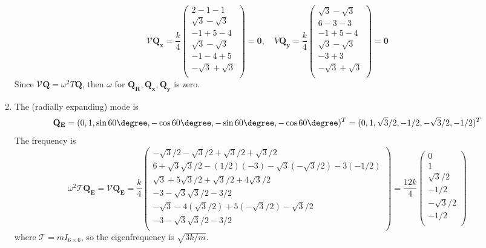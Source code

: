 \documentclass[a4paper]{article}
\begin{document}
\begin{ans}
\begin{enumerate}[label=(\roman*)]
 $$\mathcal{V}\mathbf{Q_x}=\frac{k}{4}\begin{pmatrix}2-1-1\\\sqrt{3}-\sqrt{3}\\-1+5-4\\\sqrt{3}-\sqrt{3}\\-1-4+5\\-\sqrt{3}+\sqrt{3}\\\end{pmatrix}=\boldsymbol{0},\quad V\mathbf{Q_y}=\frac{k}{4}\begin{pmatrix}\sqrt{3}-\sqrt{3}\\6-3-3\\-1+5-4\\\sqrt{3}-\sqrt{3}\\-3+3\\-\sqrt{3}+\sqrt{3}\\\end{pmatrix}=\boldsymbol{0}$$
 Since $\mathcal{V}\mathbf{Q}=\omega^2T\mathbf{Q}$, then $\omega$ for $\mathbf{Q_R},\mathbf{Q_x},\mathbf{Q_y}$ is zero.
 \item The (radially expanding) mode is $$\mathbf{Q_E}=(0,1,\sin60\degree,-\cos60\degree,-\sin60\degree,-\cos60\degree)^T=(0,1,\sqrt{3}/2,-1/2,-\sqrt{3}/2,-1/2)^T$$ The frequency is
 $$\omega^2\mathcal{T}\mathbf{Q_E}=\mathcal{V}\mathbf{Q_E}=\frac{k}{4}\begin{pmatrix}-\sqrt{3}/2-\sqrt{3}/2+\sqrt{3}/2+\sqrt{3}/2\\6+\sqrt{3}\sqrt{3}/2-(1/2)(-3)-\sqrt{3}(-\sqrt{3}/2)-3(-1/2)\\\sqrt{3}+5\sqrt{3}/2+\sqrt{3}/2+4\sqrt{3}/2\\-3-\sqrt{3}\sqrt{3}/2-3/2\\-\sqrt{3}-4(\sqrt{3}/2)+5(-\sqrt{3}/2)-\sqrt{3}/2\\-3-\sqrt{3}\sqrt{3}/2-3/2\\\end{pmatrix}=\frac{12k}{4}\begin{pmatrix}0\\1\\\sqrt{3}/2\\-1/2\\-\sqrt{3}/2\\-1/2\\\end{pmatrix}$$
 where $\mathcal{T}=mI_{6\times 6}$,  so the eigenfrequency is $\sqrt{3k/m}$.
\end{enumerate}
\end{ans}
\newpage
\end{document}
